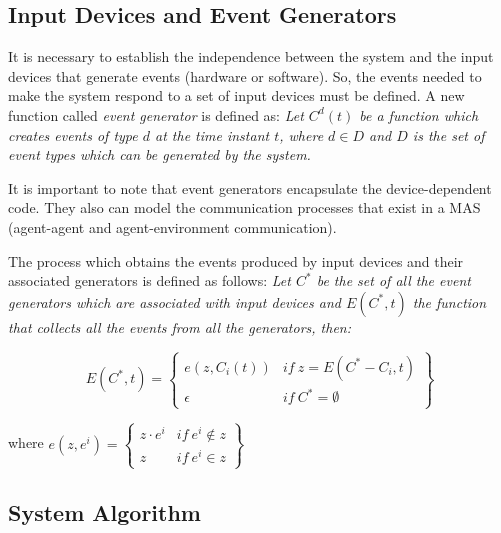 \documentclass{aamas2012}
\begin{document}
\subsection{Input Devices and Event Generators
\label{sec:input_devices}}

It is necessary to establish the independence between the system and the input devices
that generate events (hardware or software). So, the events needed to make
the system respond to a set of input devices must be defined.
A new function called \textit{event generator} is defined as: {\itshape
Let $C^d(t)$ be a function which creates events of type $d$ at the time instant $t$,
where $d \in D$ and $D$ is the set of event types which can be generated by the system. }

It is important to note that event generators encapsulate the device-dependent code.
They also can model the communication processes that exist in a MAS (agent-agent and
agent-environment communication).

The process which obtains the events produced by input devices and their associated
generators is defined as follows: {\itshape
Let $C^*$ be the set of all the event generators which are associated with input
devices and $E(C^*, t)$ the function that collects all the events from all the generators, then:}


\begin{small}
\begin{equation}
     E(C^*, t) = \left\{
    \begin{array}{ll}
        e(z, C_i(t))   &  \mathit{if}  \ z = E(C^* - C_i, t) \\
        \epsilon   &  \mathit{if} \ C^* = \emptyset
    \end{array}\right\}
\end{equation}
\end{small}



where    $e(z, e^i) = \left\{
    \begin{array}{ll}
        z \cdot e^i   &   \mathit{if} \ e^i \notin z \\
        z    &   \mathit{if} \ e^i \in z
    \end{array}
    \right\}$



\subsection{System Algorithm
\label{sec:system_algorithm}}
\end{document}
